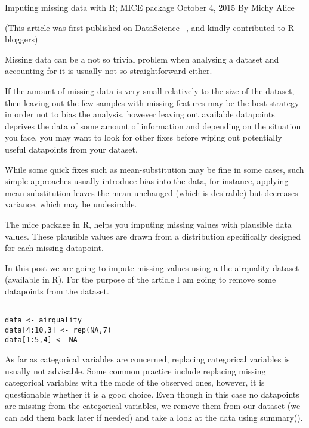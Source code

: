 
Imputing missing data with R; MICE package
October 4, 2015
By Michy Alice

(This article was first published on DataScience+, and kindly contributed to R-bloggers)

Missing data can be a not so trivial problem when analysing a dataset and accounting for it is usually not so straightforward either.

If the amount of missing data is very small relatively to the size of the dataset, then leaving out the few samples with missing features may be the best strategy in order not to bias the analysis, however leaving out available datapoints deprives the data of some amount of information and depending on the situation you face, you may want to look for other fixes before wiping out potentially useful datapoints from your dataset.

While some quick fixes such as mean-substitution may be fine in some cases, such simple approaches usually introduce bias into the data, for instance, applying mean substitution leaves the mean unchanged (which is desirable) but decreases variance, which may be undesirable.

The mice package in R, helps you imputing missing values with plausible data values. These plausible values are drawn from a distribution specifically designed for each missing datapoint.

In this post we are going to impute missing values using a the airquality dataset (available in R).
For the purpose of the article I am going to remove some datapoints from the dataset.

\begin{framed}
\begin{verbatim}

data <- airquality
data[4:10,3] <- rep(NA,7)
data[1:5,4] <- NA
\end{verbatim}
\end{framed}

As far as categorical variables are concerned, replacing categorical variables is usually not advisable. Some common practice include replacing missing categorical variables with the mode of the observed ones, however, it is questionable whether it is a good choice. Even though in this case no datapoints are missing from the categorical variables, we remove them from our dataset (we can add them back later if needed) and take a look at the data using summary().

